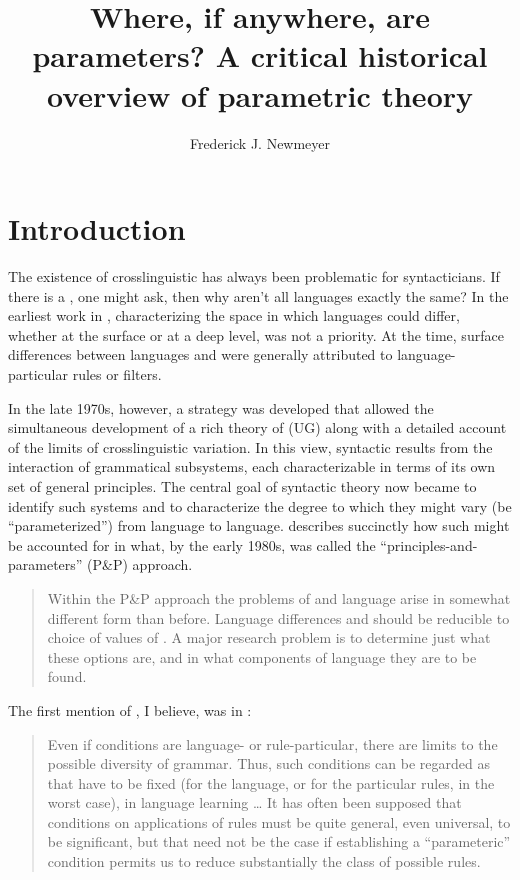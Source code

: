\documentclass[output=paper,
modfonts
]{LSP/langsci}
\title{Where, if anywhere, are parameters? A critical historical overview of parametric theory}
\author{%
Frederick J. Newmeyer\affiliation{University of Washington, University of British Columbia, and Simon Fraser University}
}
\begin{document}
\maketitle

\section{Introduction}

The existence of crosslinguistic  has always been problematic
for syntacticians. If there is a
, one might ask, then why aren't all languages exactly
the same? In the earliest work in , characterizing the
space in which languages could differ, whether at the surface or at a
deep level, was not a priority. At the time, surface differences between
languages and  were generally attributed to language-particular
rules or filters.

In the late 1970s, however, a strategy was developed that allowed the
simultaneous development of a rich theory of  (UG)
along with a detailed account of the limits of crosslinguistic
 variation. In this view, syntactic  results
from the interaction of grammatical subsystems, each characterizable in
terms of its own set of general principles. The central goal of
syntactic theory now became to identify such systems and to characterize
the degree to which they might vary (be ``parameterized'') from language
to language. \citet{chomsky1995} describes succinctly how such 
might be accounted for in what, by the early 1980s, was called the
``principles-and-parameters'' (P\&P) approach.

\begin{quote}
Within the P\&P approach the problems of  and language 
arise in somewhat different form than before. Language differences and
 should be reducible to choice of values of . A major
research problem is to determine just what these options are, and in
what components of language they are to be found. \citep[6]{chomsky1995}
\end{quote}

The first mention of , I believe, was in \citet{chomsky1976}:

\begin{quote}
Even if conditions are language- or rule-particular, there are limits to
the possible diversity of grammar. Thus, such conditions can be regarded
as  that have to be fixed (for the language, or for the
particular rules, in the worst case), in language learning \ldots{} It
has often been supposed that conditions on applications of rules must be
quite general, even universal, to be significant, but that need not be
the case if establishing a ``parameteric'' condition permits us to reduce
substantially the class of possible rules. \citep[315]{chomsky1976}
\end{quote}
\end{document}
